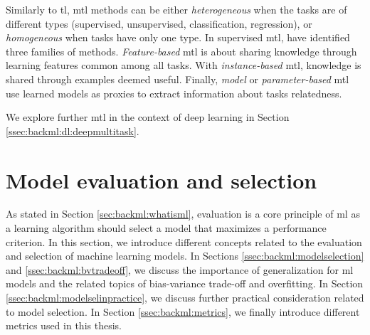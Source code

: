 Similarly to \acrlong{tl}, \acrlong{mtl} methods can be either \textit{heterogeneous}
when the tasks are of different types (\eg supervised, unsupervised, classification,
regression), or \textit{homogeneous} when tasks have only one type. In supervised
\acrlong{mtl}, \citeauthor{zhang2017survey} \cite{zhang2017survey} have identified three families of
methods. \textit{Feature-based} \acrlong{mtl} is about sharing knowledge through
learning features common among all tasks. With \textit{instance-based} \acrlong{mtl},
knowledge is shared through examples deemed useful. Finally, \textit{model} or
\textit{parameter-based} \acrlong{mtl} use learned models as proxies to extract
information about tasks relatedness.

We explore further \acrlong{mtl} in the context of deep learning in Section
\ref{ssec:backml:dl:deepmultitask}.


\section{Model evaluation and selection}
\label{sec:backml:modeleval}

As stated in Section \ref{sec:backml:whatisml}, evaluation is a core principle of
\acrlong{ml} as a learning algorithm should select a model that maximizes a
performance criterion. In this section, we introduce different concepts related
to the evaluation and selection of machine learning models. In Sections
\ref{ssec:backml:modelselection} and \ref{ssec:backml:bvtradeoff}, we discuss the
importance of generalization for \acrlong{ml} models and the related topics of
bias-variance trade-off and overfitting. In Section \ref{ssec:backml:modelselinpractice},
we discuss further practical consideration related to model selection. In Section
\ref{ssec:backml:metrics}, we finally introduce different metrics used in this
thesis.


